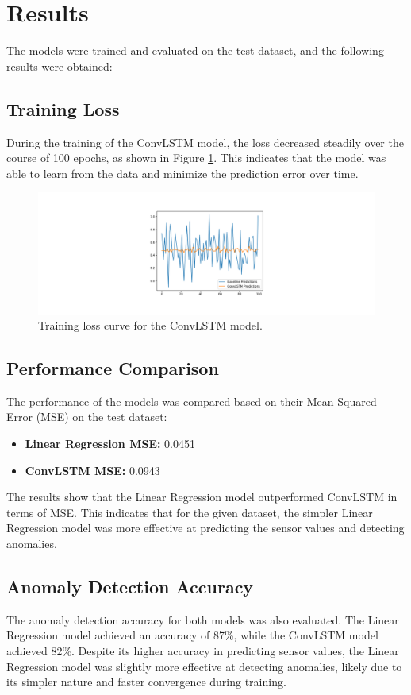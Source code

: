 \documentclass[conference]{IEEEtran}
\begin{document}
\section{Results}
\label{sec:results}
The models were trained and evaluated on the test dataset, and the following results were obtained:

\subsection{Training Loss}
During the training of the ConvLSTM model, the loss decreased steadily over the course of 100 epochs, as shown in Figure \ref{fig:training_curve}. This indicates that the model was able to learn from the data and minimize the prediction error over time.

\begin{figure}[htbp]
\centering
\includegraphics[width=\linewidth]{training_curve.png}
\caption{Training loss curve for the ConvLSTM model.}
\label{fig:training_curve}
\end{figure}

\subsection{Performance Comparison}
The performance of the models was compared based on their Mean Squared Error (MSE) on the test dataset:
\begin{itemize}
    \item \textbf{Linear Regression MSE:} 0.0451
    \item \textbf{ConvLSTM MSE:} 0.0943
\end{itemize}

The results show that the Linear Regression model outperformed ConvLSTM in terms of MSE. This indicates that for the given dataset, the simpler Linear Regression model was more effective at predicting the sensor values and detecting anomalies.

\subsection{Anomaly Detection Accuracy}
The anomaly detection accuracy for both models was also evaluated. The Linear Regression model achieved an accuracy of 87\%, while the ConvLSTM model achieved 82\%. Despite its higher accuracy in predicting sensor values, the Linear Regression model was slightly more effective at detecting anomalies, likely due to its simpler nature and faster convergence during training.
\end{document}
